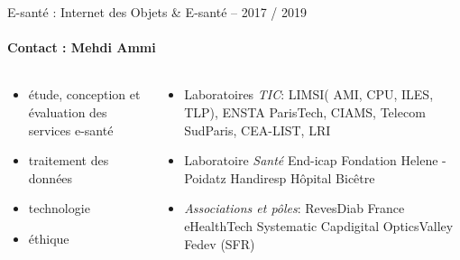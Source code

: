 \begin{frame}{ E-santé : Internet des Objets \& E-santé – 2017 / 2019}
\framesubtitle{Contact : Mehdi Ammi}
\vspace*{-1cm}
{\color{blue} }


\begin{columns}
  \begin{column}{6cm}
    \begin{itemize}
    \item étude, conception et évaluation des services e-santé
    \item traitement des données
    \item technologie
    \item éthique
    \end{itemize}
  \end{column}
  \begin{column}{7cm}
    \begin{itemize}
    \item
      Laboratoires \textit{TIC}:
      LIMSI( AMI, CPU, ILES, TLP),
      ENSTA ParisTech,
      CIAMS,
      Telecom SudParis,
      CEA-LIST,
      LRI
    \item
      Laboratoire \textit{Santé}
      End-icap
      Fondation Helene - Poidatz
      Handiresp
      Hôpital Bicêtre 
    \item
      \textit{Associations et pôles}:
      RevesDiab
      France eHealthTech
      Systematic
      Capdigital
      OpticsValley
      Fedev (SFR)
    \end{itemize}
  \end{column}
\end{columns}
\end{frame}


